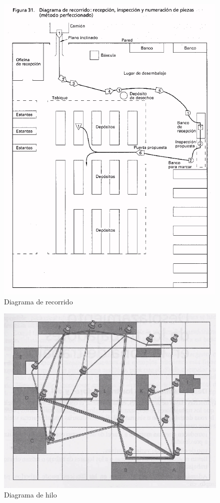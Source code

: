 \documentclass[a4paper,oneside,11pt]{article}
\begin{document}
\begin{figure} [ht!]
    \centering
    \includegraphics[scale=0.8]{recorrido.png}
    \caption{Diagrama de recorrido}
    \label{fig:recorrido}
\end{figure}

\begin{figure} [ht!]
    \centering
    \includegraphics[width=0.5\linewidth]{hilos.png}
    \caption{Diagrama de hilo}
    \label{fig:hilos}
\end{figure}
\end{document}
